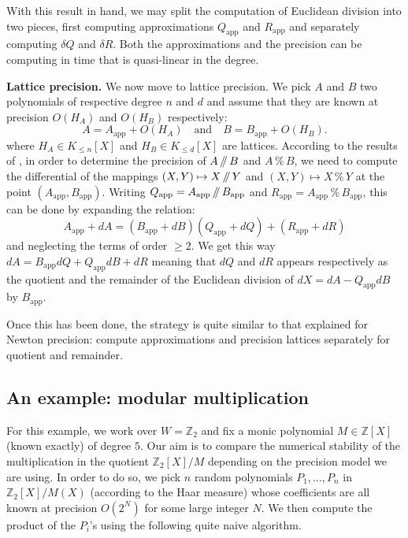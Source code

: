 \documentclass{sig-alternate-05-2015}
\newcommand{\Z}{\mathbb Z}
\renewcommand{\mod}{\,\%\,}
\renewcommand{\div}{\,/\hspace{-0.3em}/\,}
\newcommand{\app}{\textrm{app}}
\theoremstyle{definition}
\begin{document}
With this result in hand, we may split the computation of
Euclidean division into two pieces, first computing approximations
$Q_\app$ and $R_\app$ and separately computing $\delta Q$ and $\delta R$.
Both the approximations and the precision can be computing in time that is
quasi-linear in the degree. 

\medskip

\noindent
{\bf Lattice precision.}
We now move to lattice precision. We pick $A$ and $B$ two polynomials 
of respective degree $n$ and $d$ and assume that they are known at 
precision $O(H_A)$ and $O(H_B)$ respectively:
$$A = A_\app + O(H_A)
\quad \text{and} \quad
B = B_\app + O(H_B).$$
where $H_A \in K_{\leq n}[X]$ and $H_B \in K_{\leq d}[X]$ are lattices. 
According to the results of \cite{caruso-roe-vaccon:14a}, in order to determine the 
precision of $A \div B$ and $A \mod B$, we need to compute the 
differential of the mappings $(X,Y) \mapsto X \div Y$ and $(X,Y)
\mapsto X \mod Y$ at the point $(A_\app, B_\app)$. Writing $Q_\app = A_\app \div
B_\app$ and $R_\app = A_\app \mod B_\app$, this can be done by
expanding the relation:
$$A_\app + dA = (B_\app + dB) (Q_\app + dQ) + (R_\app + dR)$$
and neglecting the terms of order $\geq 2$. We get this way 
$dA = B_\app dQ + Q_\app dB + dR$
meaning that $dQ$ and $dR$ appears respectively as the quotient and
the remainder of the Euclidean division of $dX = dA - Q_\app dB$ by $B_\app$.

Once this has been done, the strategy is quite similar to that explained 
for Newton precision: compute approximations and precision lattices
separately for quotient and remainder.

\subsection{An example: modular multiplication}

For this example, we work over $W = \Z_2$ and fix a monic polynomial $M 
\in \Z[X]$ (known exactly) of degree $5$. Our aim is to compare the 
numerical stability of the multiplication in the quotient $\Z_2[X]/M$ 
depending on the precision model we are using. In order to do so, we 
pick $n$ random polynomials $P_1, \ldots, P_n$ in $\Z_2[X]/M(X)$ 
(according to the Haar measure) whose coefficients are all known at 
precision $O(2^N)$ for some large integer $N$. We then compute the 
product of the $P_i$'s using the following quite naive algorithm.

\noindent\hrulefill
\end{document}
